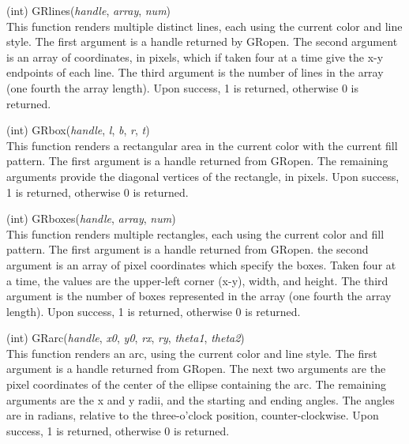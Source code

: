 \begin{description}
\item{(int) \vt GRlines({\it handle}, {\it array}, {\it num\/})}\\
This function renders multiple distinct lines, each using the current
color and line style.  The first argument is a handle returned by {\vt
GRopen}.  The second argument is an array of coordinates, in pixels,
which if taken four at a time give the x-y endpoints of each line. 
The third argument is the number of lines in the array (one fourth the
array length).  Upon success, 1 is returned, otherwise 0 is returned.

\item{(int) \vt GRbox({\it handle}, {\it l}, {\it b}, {\it r},
  {\it t\/})}\\
This function renders a rectangular area in the current color with the
current fill pattern.  The first argument is a handle returned from
{\vt GRopen}.  The remaining arguments provide the diagonal vertices
of the rectangle, in pixels.  Upon success, 1 is returned, otherwise 0
is returned.

\item{(int) \vt GRboxes({\it handle}, {\it array}, {\it num\/})}\\
This function renders multiple rectangles, each using the current
color and fill pattern.  The first argument is a handle returned from
{\vt GRopen}.  the second argument is an array of pixel coordinates
which specify the boxes.  Taken four at a time, the values are the
upper-left corner (x-y), width, and height.  The third argument is the
number of boxes represented in the array (one fourth the array
length).  Upon success, 1 is returned, otherwise 0 is returned.

\item{(int) \vt GRarc({\it handle}, {\it x0}, {\it y0}, {\it rx},
  {\it ry\/}, {\it theta1}, {\it theta2\/})}\\
This function renders an arc, using the current color and line style. 
The first argument is a handle returned from {\vt GRopen}.  The next
two arguments are the pixel coordinates of the center of the ellipse
containing the arc.  The remaining arguments are the x and y radii,
and the starting and ending angles.  The angles are in radians,
relative to the three-o'clock position, counter-clockwise.  Upon
success, 1 is returned, otherwise 0 is returned.


\end{description}
